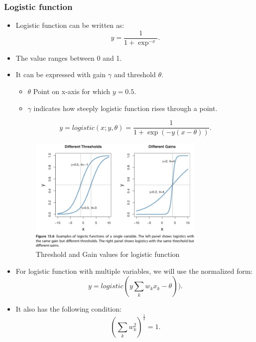 \documentclass[a4paper]{article}
\begin{document}
\subsubsection{Logistic function}
\begin{itemize}
    \item Logistic function can be written as:
        \[
            y = \frac{1}{1+\exp^{-x}} 
        .\] 
    \item The value ranges between 0 and 1.
    \item It can be expressed with gain $\gamma$ and threshold $\theta$.
        \begin{itemize}
            \item $\theta$ Point on x-axis for which $y=0.5 $.
            \item $\gamma$ indicates how steeply logistic function rises through a point.
        \end{itemize}
        \[
            y = logistic(x;y,\theta) = \frac{1}{1+\exp(-y(x-\theta))}
        .\] 
        \begin{figure}[H]
            \centering
            \includegraphics[width=0.8\textwidth]{logistic_function}
            \caption{Threshold and Gain values for logistic function}
            \label{fig:logistic_function}
        \end{figure}
    \item For logistic function with multiple variables, we will use the normalized form:
        \[
            y = logistic(y \sum_{k} w_kx_k-\theta))
        .\] 
    \item It also has the following condition:
        \[
            (\sum_{k} w_k^2)^\frac{1}{2} = 1
        .\] 
        \begin{figure}[H]
            \centering

\end{figure}
\end{itemize}
\end{document}
